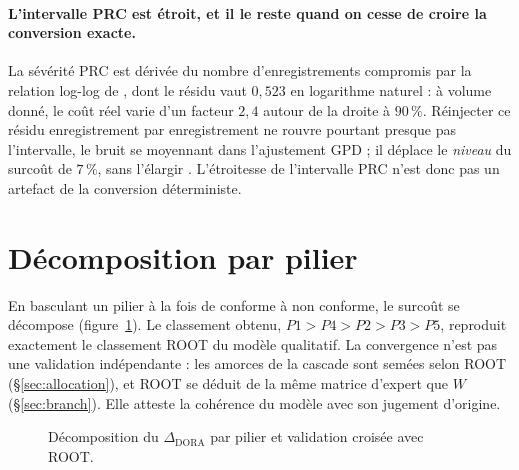 \paragraph{L'intervalle PRC est étroit, et il le reste quand on cesse de croire la conversion
exacte.} La sévérité PRC est dérivée du nombre d'enregistrements compromis par la relation
log-log de \citet{jacobs2014}, dont le résidu vaut $0{,}523$ en logarithme naturel : à volume donné,
le coût réel varie d'un facteur $2{,}4$ autour de la droite à $90\,\%$. Réinjecter ce résidu
enregistrement par enregistrement ne rouvre pourtant presque pas l'intervalle, le bruit se
moyennant dans l'ajustement GPD ; il déplace le \emph{niveau} du surcoût de $7\,\%$, sans
l'élargir \matcomp. L'étroitesse de l'intervalle PRC n'est donc pas un artefact
de la conversion déterministe.

\section{Décomposition par pilier}

En basculant un pilier à la fois de conforme à non conforme, le surcoût se décompose
(figure~\ref{fig:decomp}). Le classement obtenu, $P1>P4>P2>P3>P5$, reproduit exactement
le classement ROOT du modèle qualitatif. La convergence n'est pas une validation
indépendante : les amorces de la cascade sont semées selon ROOT (\S\ref{sec:allocation}), et ROOT
se déduit de la même matrice d'expert que $W$ (\S\ref{sec:branch}). Elle atteste la cohérence
du modèle avec son jugement d'origine.

\begin{figure}[htbp]\centering
{}
\caption{Décomposition du $\Delta_{\text{DORA}}$ par pilier et validation croisée avec ROOT.
}
\label{fig:decomp}
\end{figure}

